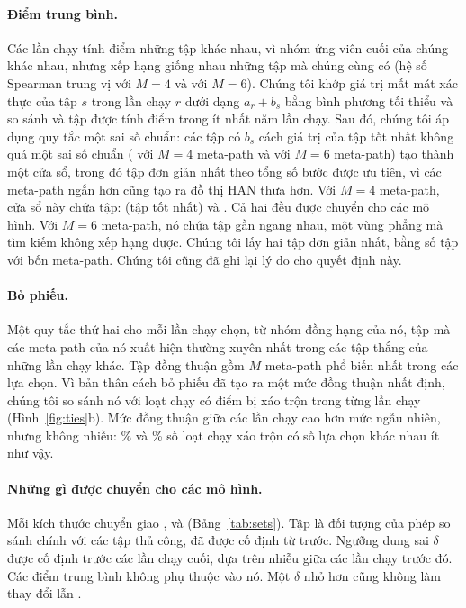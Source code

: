 

\paragraph{Điểm trung bình.} Các lần chạy tính điểm những tập khác nhau, vì nhóm ứng viên cuối của
chúng khác nhau, nhưng xếp hạng giống nhau những tập mà chúng cùng có (hệ số Spearman trung vị
 với $M = 4$ và  với $M = 6$).
Chúng tôi khớp giá trị mất mát xác thực của tập $s$ trong lần chạy $r$ dưới dạng $a_r + b_s$ bằng
bình phương tối thiểu và so sánh  và  tập được tính
điểm trong ít nhất năm lần chạy. Sau đó, chúng tôi áp dụng quy tắc một sai số chuẩn: các tập có $b_s$
cách giá trị của tập tốt nhất không quá một sai số chuẩn ( với $M = 4$ meta-path và
 với $M = 6$ meta-path) tạo thành một cửa sổ, trong đó tập đơn giản nhất theo tổng
số bước được ưu tiên, vì các meta-path ngắn hơn cũng tạo ra đồ thị HAN thưa hơn. Với $M = 4$
meta-path, cửa sổ này chứa  tập:  (tập tốt nhất) và . Cả hai
đều được chuyển cho các mô hình. Với $M = 6$ meta-path, nó chứa  tập gần ngang
nhau, một vùng phẳng mà tìm kiếm không xếp hạng được. Chúng tôi lấy hai tập đơn giản nhất, bằng
số tập với bốn meta-path. Chúng tôi cũng đã ghi lại lý do cho quyết định này.

\paragraph{Bỏ phiếu.} Một quy tắc thứ hai cho mỗi lần chạy chọn, từ nhóm đồng hạng của nó, tập mà
các meta-path của nó xuất hiện thường xuyên nhất trong các tập thắng của những lần chạy khác. Tập
đồng thuận  gồm $M$ meta-path phổ biến nhất trong các lựa chọn. Vì bản thân cách bỏ phiếu
đã tạo ra một mức đồng thuận nhất định, chúng tôi so sánh nó với  loạt chạy
có điểm bị xáo trộn trong từng lần chạy (Hình~\ref{fig:ties}b). Mức đồng
thuận giữa các lần chạy cao hơn mức ngẫu nhiên, nhưng không nhiều: \% và
\% số loạt chạy xáo trộn có số lựa chọn khác nhau ít như vậy.

\paragraph{Những gì được chuyển cho các mô hình.} Mỗi kích thước chuyển giao , 
và  (Bảng~\ref{tab:sets}). Tập  là đối tượng của phép so sánh chính với các tập thủ
công, đã được cố định từ trước. Ngưỡng dung sai $\delta$ được cố định trước các lần chạy cuối, dựa
trên nhiễu giữa các lần chạy trước đó. Các điểm trung bình không phụ thuộc vào nó. Một $\delta$
nhỏ hơn cũng không làm thay đổi  lẫn .

